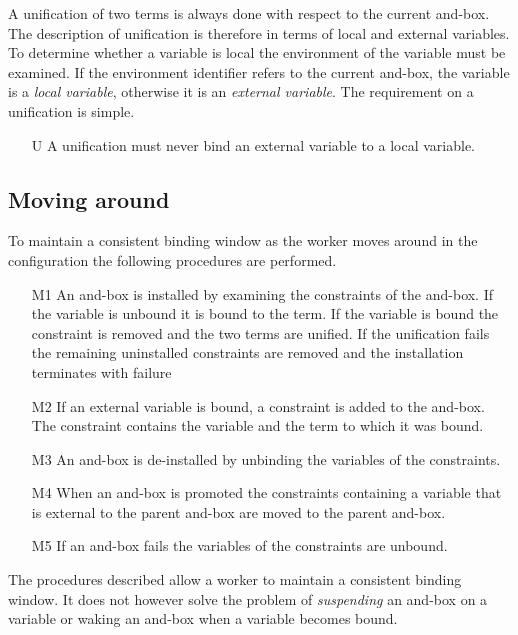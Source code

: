 A unification of two terms is always done with respect to the current
and-box. The description of unification is therefore in terms of local
and external variables. To determine whether a variable is local the
environment of the variable must be examined. If the environment
identifier refers to the current and-box, the variable is a {\em local
variable}, otherwise it is an {\em external variable}. The requirement
on a unification is simple.

\begin{itemize}
\item[U] A unification must never bind an external variable 
to a local variable.
\end{itemize}



\subsection*{Moving around}

To maintain a consistent binding window as the worker moves around in
the configuration the following procedures are performed.


\begin{itemize}

\item[M1] An and-box is installed by examining the constraints of the and-box. 
If the variable is unbound it is bound to the term. If the variable is
bound the constraint is removed and the two terms are unified. If the
unification fails the remaining uninstalled constraints are removed and the
installation terminates with failure

\item[M2] If an external variable is bound, a constraint is added 
to the and-box. The constraint contains the variable and the term to
which it was bound.

\item[M3] An and-box is de-installed by unbinding the variables of the 
constraints.

\item[M4] When an and-box is promoted the constraints containing a variable 
that is external to the parent and-box are moved to the parent and-box.

\item[M5] If an and-box fails the variables of the constraints are unbound.

\end{itemize}

The procedures described allow a worker to maintain a consistent
binding window. It does not however solve the problem of {\em suspending}
an and-box on a variable or waking an and-box when a variable becomes bound. 

